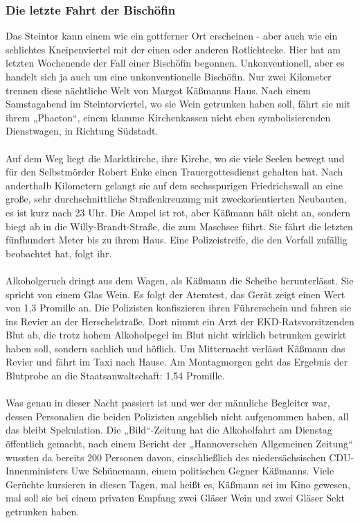 \documentclass[a4paper,12pt,oneside]{scrbook}
\begin{document}
\subsubsection{Die letzte Fahrt der Bischöfin}
Das Steintor kann einem wie ein gottferner Ort erscheinen - aber auch wie ein schlichtes Kneipenviertel mit der einen oder anderen Rotlichtecke. Hier hat am letzten Wochenende der Fall einer Bischöfin begonnen. Unkonventionell, aber es handelt sich ja auch um eine unkonventionelle Bischöfin. Nur zwei Kilometer trennen diese nächtliche Welt von Margot Käßmanns Haus. Nach einem Samstagabend im Steintorviertel, wo sie Wein getrunken haben soll, fährt sie mit ihrem „Phaeton“, einem klamme Kirchenkassen nicht eben symbolisierenden Dienstwagen, in Richtung Südstadt.
\\\\
Auf dem Weg liegt die Marktkirche, ihre Kirche, wo sie viele Seelen bewegt und für den Selbstmörder Robert Enke einen Trauergottesdienst gehalten hat. Nach anderthalb Kilometern gelangt sie auf dem sechsspurigen Friedrichswall an eine große, sehr durchschnittliche Straßenkreuzung mit zweckorientierten Neubauten, es ist kurz nach 23 Uhr. Die Ampel ist rot, aber Käßmann hält nicht an, sondern biegt ab in die Willy-Brandt-Straße, die zum Maschsee führt. Sie fährt die letzten fünfhundert Meter bis zu ihrem Haus. Eine Polizeistreife, die den Vorfall zufällig beobachtet hat, folgt ihr.
\\\\
Alkoholgeruch dringt aus dem Wagen, als Käßmann die Scheibe herunterlässt. Sie spricht von einem Glas Wein. Es folgt der Atemtest, das Gerät zeigt einen Wert von 1,3 Promille an. Die Polizisten konfiszieren ihren Führerschein und fahren sie ins Revier an der Herschelstraße. Dort nimmt ein Arzt der EKD-Ratsvorsitzenden Blut ab, die trotz hohem Alkoholpegel im Blut nicht wirklich betrunken gewirkt haben soll, sondern sachlich und höflich. Um Mitternacht verlässt Käßmann das Revier und fährt im Taxi nach Hause. Am Montagmorgen geht das Ergebnis der Blutprobe an die Staatsanwaltschaft: 1,54 Promille.
\\\\
Was genau in dieser Nacht passiert ist und wer der männliche Begleiter war, dessen Personalien die beiden Polizisten angeblich nicht aufgenommen haben, all das bleibt Spekulation. Die „Bild“-Zeitung hat die Alkoholfahrt am Dienstag öffentlich gemacht, nach einem Bericht der „Hannoverschen Allgemeinen Zeitung“ wussten da bereits 200 Personen davon, einschließlich des niedersächsischen CDU-Innenministers Uwe Schünemann, einem politischen Gegner Käßmanns. Viele Gerüchte kursieren in diesen Tagen, mal heißt es, Käßmann sei im Kino gewesen, mal soll sie bei einem privaten Empfang zwei Gläser Wein und zwei Gläser Sekt getrunken haben.
\end{document}
